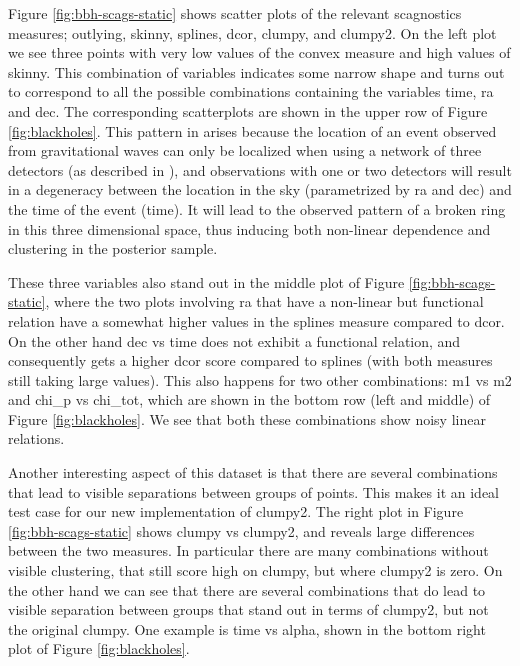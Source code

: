 Figure \ref{fig:bbh-scags-static} shows scatter plots of the relevant
scagnostics measures; outlying, skinny, splines, dcor, clumpy, and
clumpy2. On the left plot we see three points with very low values of
the convex measure and high values of skinny. This combination of
variables indicates some narrow shape and turns out to correspond to all
the possible combinations containing the variables time, ra and dec. The
corresponding scatterplots are shown in the upper row of Figure
\ref{fig:blackholes}. This pattern in arises because the location of an
event observed from gravitational waves can only be localized when using
a network of three detectors (as described in \citet{gwtriang}), and
observations with one or two detectors will result in a degeneracy
between the location in the sky (parametrized by ra and dec) and the
time of the event (time). It will lead to the observed pattern of a
broken ring in this three dimensional space, thus inducing both
non-linear dependence and clustering in the posterior sample.

These three variables also stand out in the middle plot of Figure
\ref{fig:bbh-scags-static}, where the two plots involving ra that have a
non-linear but functional relation have a somewhat higher values in the
splines measure compared to dcor. On the other hand dec vs time does not
exhibit a functional relation, and consequently gets a higher dcor score
compared to splines (with both measures still taking large values). This
also happens for two other combinations: m1 vs m2 and chi\_p vs
chi\_tot, which are shown in the bottom row (left and middle) of Figure
\ref{fig:blackholes}. We see that both these combinations show noisy
linear relations.

Another interesting aspect of this dataset is that there are several
combinations that lead to visible separations between groups of points.
This makes it an ideal test case for our new implementation of clumpy2.
The right plot in Figure \ref{fig:bbh-scags-static} shows clumpy vs
clumpy2, and reveals large differences between the two measures. In
particular there are many combinations without visible clustering, that
still score high on clumpy, but where clumpy2 is zero. On the other hand
we can see that there are several combinations that do lead to visible
separation between groups that stand out in terms of clumpy2, but not
the original clumpy. One example is time vs alpha, shown in the bottom
right plot of Figure \ref{fig:blackholes}.

